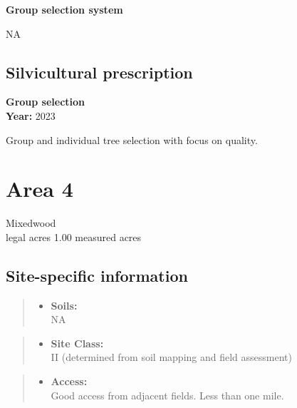 \documentclass[]{tufte-handout}
\providecommand{\tightlist}{%
  \setlength{\itemsep}{0pt}\setlength{\parskip}{0pt}}
\begin{document}
\textbf{Group selection system}

NA

\subsection{Silvicultural
prescription}\label{silvicultural-prescription-2}

\textbf{Group selection}\\
\noindent \textbf{Year:} 2023

Group and individual tree selection with focus on quality.

\newpage

\section{Area 4}\label{area-4}

Mixedwood\\
 legal acres \textbar{} 1.00 measured acres

\subsection{Site-specific
information}\label{site-specific-information-3}

\begin{quote}
\begin{itemize}
\tightlist
\item
  \textbf{Soils:}\\
  \indent\indent  NA
\end{itemize}
\end{quote}

\begin{quote}
\begin{itemize}
\tightlist
\item
  \textbf{Site Class:}\\
  \vspace{2pt} II (determined from soil mapping and field assessment)
\end{itemize}
\end{quote}

\begin{quote}
\begin{itemize}
\tightlist
\item
  \textbf{Access:}\\
  \vspace{2pt} Good access from adjacent fields. Less than one mile.
\end{itemize}
\end{quote}
\end{document}
